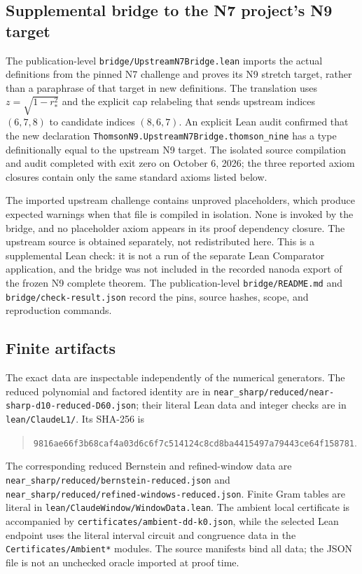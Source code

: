 \documentclass[11pt]{article}
\theoremstyle{remark}
\newcommand{\code}[1]{{\small\nolinkurl{#1}}}
\newcommand{\pathcode}[1]{\nolinkurl{#1}}
\begin{document}
\subsection{Supplemental bridge to the N7 project's N9 target}
The publication-level \pathcode{bridge/UpstreamN7Bridge.lean} imports the
actual definitions from the pinned N7 challenge and proves its N9 stretch
target, rather than a paraphrase of that target in new definitions. The
translation uses $z=\sqrt{1-r_*^2}$ and the explicit cap relabeling that sends
upstream indices $(6,7,8)$ to candidate indices $(8,6,7)$. An explicit Lean
audit confirmed that the new declaration
\code{ThomsonN9.UpstreamN7Bridge.thomson_nine} has a type definitionally equal
to the upstream N9 target. The isolated source compilation and audit completed
with exit zero on October 6, 2026; the three reported axiom closures contain
only the same standard axioms listed below.

The imported upstream challenge contains unproved placeholders, which produce
expected warnings when that file is compiled in isolation. None is invoked
by the bridge, and no placeholder axiom appears in its proof dependency
closure. The upstream source is obtained separately, not redistributed here.
This is a supplemental Lean check: it is not a run of the separate Lean
Comparator application, and the bridge was not included in the recorded
nanoda export of the frozen N9 complete theorem. The publication-level
\pathcode{bridge/README.md} and \pathcode{bridge/check-result.json} record the
pins, source hashes, scope, and reproduction commands.

\subsection{Finite artifacts}
The exact data are inspectable independently of the numerical generators.
The reduced polynomial and factored identity are in
\pathcode{near_sharp/reduced/near-sharp-d10-reduced-D60.json}; their literal
Lean data and integer checks are in \pathcode{lean/ClaudeL1/}. Its SHA-256 is
\begin{quote}\footnotesize
\pathcode{9816ae66f3b68caf4a03d6c6f7c514124c8cd8ba4415497a79443ce64f158781}.
\end{quote}
The corresponding reduced Bernstein and refined-window data are
\pathcode{near_sharp/reduced/bernstein-reduced.json} and
\pathcode{near_sharp/reduced/refined-windows-reduced.json}.
Finite Gram tables are literal in \pathcode{lean/ClaudeWindow/WindowData.lean}.
The ambient local certificate is accompanied by
\pathcode{certificates/ambient-dd-k0.json}, while the selected Lean endpoint
uses the literal interval circuit and congruence data in the
\pathcode{Certificates/Ambient*} modules. The source manifests bind all data;
the JSON file is not an unchecked oracle imported at proof time.
\end{document}
